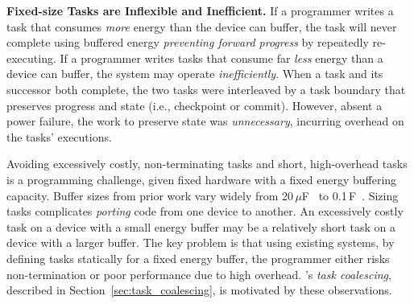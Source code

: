 \textbf{Fixed-size Tasks are Inflexible and Inefficient.} If a programmer writes a task that consumes {\em more} energy than the device can buffer, the task will never complete using buffered energy {\em preventing forward progress} by repeatedly re-executing. If a programmer writes tasks that consume far {\em less} energy than a device can buffer, the system may operate {\em inefficiently}. When a task and its successor both complete, the two tasks were interleaved by a task boundary that preserves progress and state (i.e., checkpoint or commit). However, absent a power failure, the work to preserve state was {\em unnecessary}, incurring overhead on the tasks' executions.

Avoiding excessively costly, non-terminating tasks and short, high-overhead tasks is a programming challenge, given fixed hardware with a fixed energy buffering capacity. Buffer sizes from prior work vary widely from 20\,$\mu $F~\cite{rodriguez_tbcs_2015} to 0.1\,F~\cite{moo}. Sizing tasks complicates {\em porting} code from one device to another. An excessively costly task on a device with a small energy buffer may be a relatively short task on a device with a larger buffer. The key problem is that using existing systems, by defining tasks statically for a fixed energy buffer, the programmer
either risks non-termination or poor performance due to high overhead. \sys's {\em task coalescing}, described
in Section~\ref{sec:task_coalescing}, is motivated by these observations.
